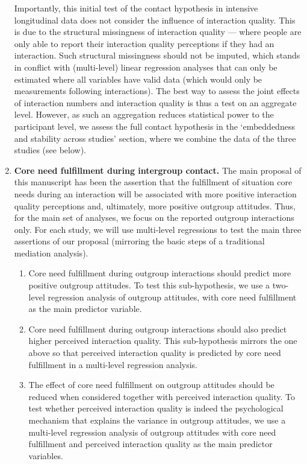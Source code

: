 \documentclass[man, 12pt, a4paper, mask]{apa7}
\theoremstyle{break}
\theoremstyle{plain}
\begin{document}
\begin{enumerate}
    Importantly, this initial test of the contact hypothesis in intensive longitudinal data does not consider the influence of interaction quality. This is due to the structural missingness of interaction quality --- where people are only able to report their interaction quality perceptions if they had an interaction. Such structural missingness should not be imputed, which stands in conflict with (multi-level) linear regression analyses that can only be estimated where all variables have valid data (which would only be measurements following interactions). The best way to assess the joint effects of interaction numbers and interaction quality is thus a test on an aggregate level. However, as such an aggregation reduces statistical power to the participant level, we assess the full contact hypothesis in the `embeddedness and stability across studies' section, where we combine the data of the three studies (see below).
    \item \textbf{Core need fulfillment during intergroup contact.} The main proposal of this manuscript has been the assertion that the fulfillment of situation core needs during an interaction will be associated with more positive interaction quality perceptions and, ultimately, more positive outgroup attitudes. Thus, for the main set of analyses, we focus on the reported outgroup interactions only. For each study, we will use multi-level regressions to test the main three assertions of our proposal (mirroring the basic steps of a traditional mediation analysis).
    \begin{enumerate}
        \item Core need fulfillment during outgroup interactions should predict more positive outgroup attitudes. To test this sub-hypothesis, we use a two-level regression analysis of outgroup attitudes, with core need fulfillment as the main predictor variable.
        \item Core need fulfillment during outgroup interactions should also predict higher perceived interaction quality. This sub-hypothesis mirrors the one above so that perceived interaction quality is predicted by core need fulfillment in a multi-level regression analysis.
        \item The effect of core need fulfillment on outgroup attitudes should be reduced when considered together with perceived interaction quality. To test whether perceived interaction quality is indeed the psychological mechanism that explains the variance in outgroup attitudes, we use a multi-level regression analysis of outgroup attitudes with core need fulfillment and perceived interaction quality as the main predictor variables.

\end{enumerate}
\end{enumerate}
\end{document}
